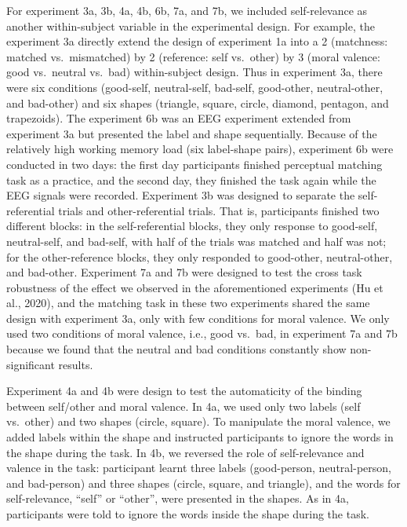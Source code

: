 \documentclass[
  english,
  man]{apa6}
\begin{document}
For experiment 3a, 3b, 4a, 4b, 6b, 7a, and 7b, we included self-relevance as another within-subject variable in the experimental design. For example, the experiment 3a directly extend the design of experiment 1a into a 2 (matchness: matched vs.~mismatched) by 2 (reference: self vs.~other) by 3 (moral valence: good vs.~neutral vs.~bad) within-subject design. Thus in experiment 3a, there were six conditions (good-self, neutral-self, bad-self, good-other, neutral-other, and bad-other) and six shapes (triangle, square, circle, diamond, pentagon, and trapezoids). The experiment 6b was an EEG experiment extended from experiment 3a but presented the label and shape sequentially. Because of the relatively high working memory load (six label-shape pairs), experiment 6b were conducted in two days: the first day participants finished perceptual matching task as a practice, and the second day, they finished the task again while the EEG signals were recorded. Experiment 3b was designed to separate the self-referential trials and other-referential trials. That is, participants finished two different blocks: in the self-referential blocks, they only response to good-self, neutral-self, and bad-self, with half of the trials was matched and half was not; for the other-reference blocks, they only responded to good-other, neutral-other, and bad-other. Experiment 7a and 7b were designed to test the cross task robustness of the effect we observed in the aforementioned experiments (Hu et al., 2020), and the matching task in these two experiments shared the same design with experiment 3a, only with few conditions for moral valence. We only used two conditions of moral valence, i.e., good vs.~bad, in experiment 7a and 7b because we found that the neutral and bad conditions constantly show non-significant results.

Experiment 4a and 4b were design to test the automaticity of the binding between self/other and moral valence. In 4a, we used only two labels (self vs.~other) and two shapes (circle, square). To manipulate the moral valence, we added labels within the shape and instructed participants to ignore the words in the shape during the task. In 4b, we reversed the role of self-relevance and valence in the task: participant learnt three labels (good-person, neutral-person, and bad-person) and three shapes (circle, square, and triangle), and the words for self-relevance, \enquote{self} or \enquote{other}, were presented in the shapes. As in 4a, participants were told to ignore the words inside the shape during the task.
\end{document}
